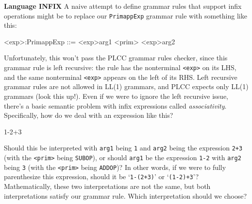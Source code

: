 \begin{minipage}[t]{\sw}
\slidenumber
\LARGE
{\bf Language INFIX}\exx
A naive attempt to define grammar rules that support infix operations might be
to replace our \verb'PrimappExp' grammar rule with something like this:
\begin{qv}
<exp>:PrimappExp  ::= <exp>arg1 <prim> <exp>arg2
\end{qv}
Unfortunately, this won't pass the PLCC grammar rules checker,
since this grammar rule is left recursive:
the rule has the nonterminal \verb'<exp>' on its LHS,
and the same nonterminal \verb'<exp>' appears
on the left of its RHS.
Left recursive grammar rules are not allowed in LL(1) grammars,
and PLCC expects only LL(1) grammars (look this up!).\exx
Even if we were to ignore the left recursive issue,
there's a basic semantic problem with infix expressions
called {\em associativity}.
Specifically, how do we deal with an expression like this?
\begin{qv}
1-2+3
\end{qv}
Should this be interpreted with \verb'arg1' being \verb'1'
and \verb'arg2' being the expression \verb'2+3'
(with the \verb'<prim>' being \verb'SUBOP'),
or should \verb'arg1' be the expression \verb'1-2'
with \verb'arg2' being \verb'3'
(with the \verb'<prim>' being \verb'ADDOP')?
In other words, if we were to fully parenthesize this expression,
should it be `\verb'1-(2+3)'' or `\verb'(1-2)+3''?
Mathematically, these two interpretations are not the same,
but both interpretations satisfy our grammar rule.
Which interpretation should we choose?
\end{minipage}
